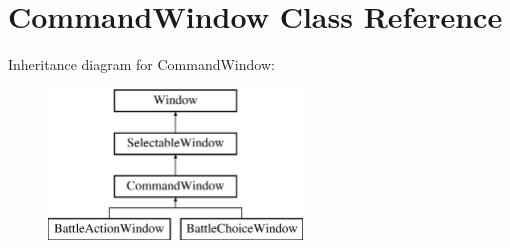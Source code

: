 \hypertarget{classCommandWindow}{\section{Command\-Window Class Reference}
\label{classCommandWindow}
}
Inheritance diagram for Command\-Window\-:\begin{figure}[H]
\begin{center}
\leavevmode
\includegraphics[height=4.000000cm]{classCommandWindow}
\end{center}
\end{figure}
